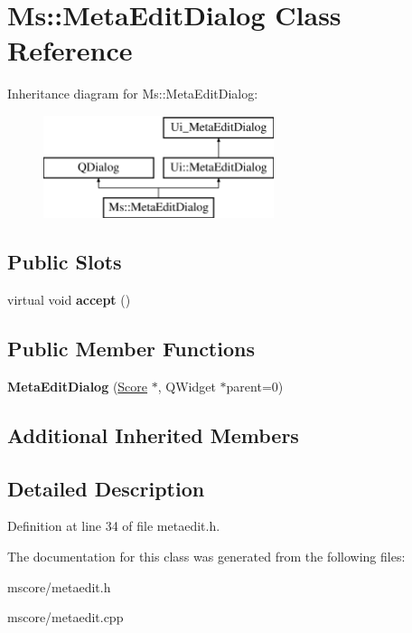 \hypertarget{class_ms_1_1_meta_edit_dialog}{}\section{Ms\+:\+:Meta\+Edit\+Dialog Class Reference}
\label{class_ms_1_1_meta_edit_dialog}
Inheritance diagram for Ms\+:\+:Meta\+Edit\+Dialog\+:\begin{figure}[H]
\begin{center}
\leavevmode
\includegraphics[height=3.000000cm]{class_ms_1_1_meta_edit_dialog}
\end{center}
\end{figure}
\subsection*{Public Slots}
\begin{DoxyCompactItemize}
\item 
\mbox{\label{class_ms_1_1_meta_edit_dialog_ab56f513445da9a61f89ae9c47a91adcf}} 
virtual void {\bfseries accept} ()
\end{DoxyCompactItemize}
\subsection*{Public Member Functions}
\begin{DoxyCompactItemize}
\item 
\mbox{\label{class_ms_1_1_meta_edit_dialog_aeed6d80a7b692b7a9e5d7a3c6939b691}} 
{\bfseries Meta\+Edit\+Dialog} (\hyperlink{class_ms_1_1_score}{Score} $\ast$, Q\+Widget $\ast$parent=0)
\end{DoxyCompactItemize}
\subsection*{Additional Inherited Members}


\subsection{Detailed Description}


Definition at line 34 of file metaedit.\+h.



The documentation for this class was generated from the following files\+:\begin{DoxyCompactItemize}
\item 
mscore/metaedit.\+h\item 
mscore/metaedit.\+cpp\end{DoxyCompactItemize}
